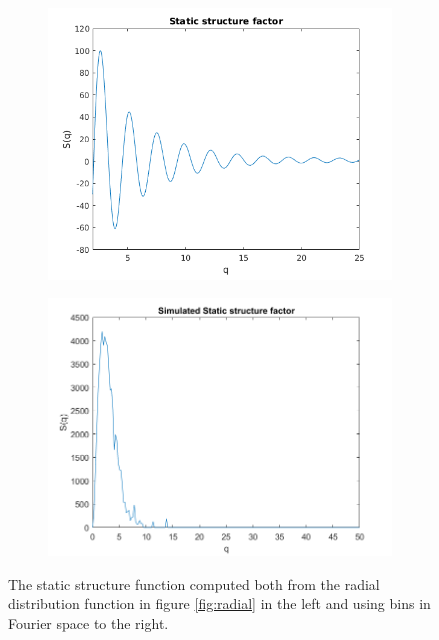 \begin{figure}[H]
    \centering
    \captionsetup[subfigure]{justification=centering}
    \begin{subfigure}[b]{0.40\textwidth}
        \centering
        \includegraphics[width=\textwidth]{graphics/task8/integral.png}
    \end{subfigure}
    \begin{subfigure}[b]{0.40\textwidth}
        \centering
        \includegraphics[width=\textwidth]{graphics/task8/simulated.png}
    \end{subfigure}
    \caption{The static structure function computed both from the radial distribution function in figure \ref{fig:radial} in the left and using bins in Fourier space to the right.}
    \label{fig:StaticStructure}
\end{figure}



